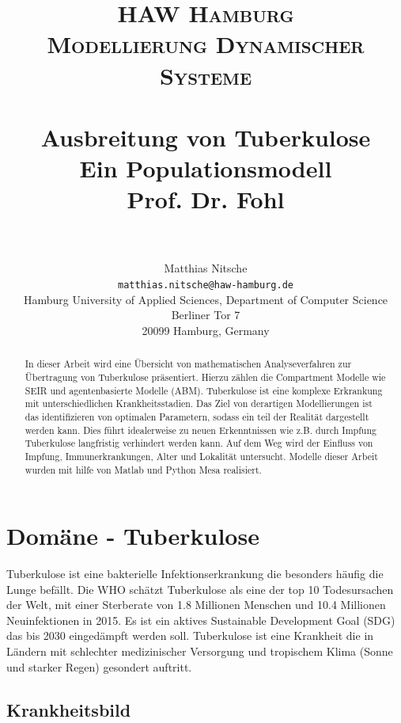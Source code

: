 \documentclass[paper=a4, fontsize=11pt, ngerman, abstract=on]{scrartcl}
\title {
  \normalfont \normalsize
  \textsc{HAW Hamburg} \\ [25pt]
  \textsc{Modellierung Dynamischer Systeme} \\ [15pt]
  \horrule{0.5pt} \\[0.4cm] %
  \huge Ausbreitung von Tuberkulose \\ [15pt] %
  \small Ein Populationsmodell \\ [15pt]
  \small Prof. Dr. Fohl \\
  \horrule{1pt} \\[0.5cm] %
}
\author{
  Matthias Nitsche \\
  \texttt{matthias.nitsche@haw-hamburg.de} \\
  \small{Hamburg University of Applied Sciences, Department of Computer Science} \\
  \small{Berliner Tor 7} \\
  \small{20099 Hamburg, Germany} \\
}
\numberwithin{equation}{section} %
\numberwithin{figure}{section} %
\numberwithin{table}{section} %
\begin{document}
\maketitle

\begin{abstract}
In dieser Arbeit wird eine Übersicht von mathematischen Analyseverfahren zur Übertragung von Tuberkulose präsentiert. Hierzu zählen die Compartment Modelle wie SEIR und agentenbasierte Modelle (ABM). Tuberkulose ist eine komplexe Erkrankung mit unterschiedlichen Krankheitsstadien. Das Ziel von derartigen Modellierungen ist das identifizieren von optimalen Parametern, sodass ein teil der Realität dargestellt werden kann. Dies führt idealerweise zu neuen Erkenntnissen wie z.B. durch Impfung Tuberkulose langfristig verhindert werden kann. Auf dem Weg wird der Einfluss von Impfung, Immunerkrankungen, Alter und Lokalität untersucht. Modelle dieser Arbeit wurden mit hilfe von Matlab und Python Mesa realisiert.
\end{abstract}

\newpage

\renewcommand{\cftsecleader}{\cftdotfill{\cftdotsep}}
\tableofcontents

\newpage


\section{Domäne - Tuberkulose}

Tuberkulose ist eine bakterielle Infektionserkrankung die besonders häufig die Lunge befällt. Die WHO schätzt Tuberkulose als eine der top 10 Todesursachen der Welt, mit einer Sterberate von 1.8 Millionen Menschen und 10.4 Millionen Neuinfektionen in 2015. Es ist ein aktives Sustainable Development Goal (SDG) das bis 2030 eingedämpft werden soll. Tuberkulose ist eine Krankheit die in Ländern mit schlechter medizinischer Versorgung und tropischem Klima (Sonne und starker Regen) gesondert auftritt. \cite{WHOTB2016}

\subsection{Krankheitsbild}
\end{document}
